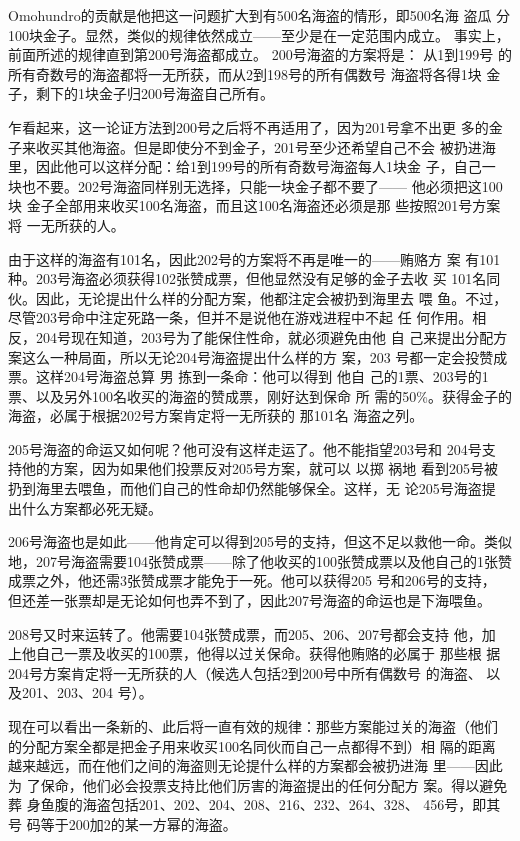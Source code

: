 Omohundro的贡献是他把这一问题扩大到有500名海盗的情形，即500名海 盗瓜
分100块金子。显然，类似的规律依然成立——至少是在一定范围内成立。  事实上，
前面所述的规律直到第200号海盗都成立。 200号海盗的方案将是： 从1到199号
的所有奇数号的海盗都将一无所获，而从2到198号的所有偶数号 海盗将各得1块
金子，剩下的1块金子归200号海盗自己所有。
    
乍看起来，这一论证方法到200号之后将不再适用了，因为201号拿不出更 多的金
子来收买其他海盗。但是即使分不到金子，201号至少还希望自己不会 被扔进海
里，因此他可以这样分配：给1到199号的所有奇数号海盗每人1块金 子，自己一
块也不要。202号海盗同样别无选择，只能一块金子都不要了—— 他必须把这100块
金子全部用来收买100名海盗，而且这100名海盗还必须是那 些按照201号方案将
一无所获的人。

由于这样的海盗有101名，因此202号的方案将不再是唯一的——贿赂方
案 有101种。203号海盗必须获得102张赞成票，但他显然没有足够的金子去收
买 101名同伙。因此，无论提出什么样的分配方案，他都注定会被扔到海里去
喂 鱼。不过，尽管203号命中注定死路一条，但并不是说他在游戏进程中不起
任 何作用。相反，204号现在知道，203号为了能保住性命，就必须避免由他
自 己来提出分配方案这么一种局面，所以无论204号海盗提出什么样的方
案，203 号都一定会投赞成票。这样204号海盗总算 男 拣到一条命：他可以得到
他自 己的1票、203号的1票、以及另外100名收买的海盗的赞成票，刚好达到保命
所 需的50\%。获得金子的海盗，必属于根据202号方案肯定将一无所获的
那101名 海盗之列。

205号海盗的命运又如何呢？他可没有这样走运了。他不能指望203号和 204号支
持他的方案，因为如果他们投票反对205号方案，就可以 以掷 祸地 看到205号被
扔到海里去喂鱼，而他们自己的性命却仍然能够保全。这样，无 论205号海盗提
出什么方案都必死无疑。

206号海盗也是如此——他肯定可以得到205号的支持，但这不足以救他一命。类似
地，207号海盗需要104张赞成票——除了他收买的100张赞成票以及他自己的1张赞
成票之外，他还需3张赞成票才能免于一死。他可以获得205 号和206号的支持，
但还差一张票却是无论如何也弄不到了，因此207号海盗的命运也是下海喂鱼。

208号又时来运转了。他需要104张赞成票，而205、206、207号都会支持 他，加
上他自己一票及收买的100票，他得以过关保命。获得他贿赂的必属于 那些根
据204号方案肯定将一无所获的人（候选人包括2到200号中所有偶数号 的海盗、
以及201、203、204 号）。
    
现在可以看出一条新的、此后将一直有效的规律：那些方案能过关的海盗（他们
的分配方案全都是把金子用来收买100名同伙而自己一点都得不到）相 隔的距离
越来越远，而在他们之间的海盗则无论提什么样的方案都会被扔进海 里——因此为
了保命，他们必会投票支持比他们厉害的海盗提出的任何分配方 案。得以避免葬
身鱼腹的海盗包括201、202、204、208、216、232、264、328、 456号，即其号
码等于200加2的某一方幂的海盗。
    
